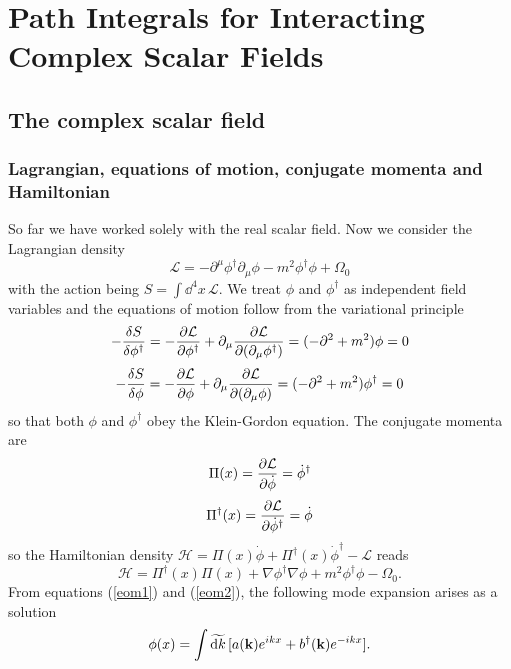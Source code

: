 \chapter{Path Integrals for Interacting Complex Scalar Fields}
\section{The complex scalar field}
\subsection{Lagrangian, equations of motion, conjugate momenta and Hamiltonian}
So far we have worked solely with the real scalar field. Now we consider the Lagrangian density
\begin{equation}
\mathcal{L}=-\partial^{\mu} \phi^{\dagger} \partial_{\mu} \phi-{m}^{2} \phi^{\dagger} \phi+\Omega_{0}
\end{equation}
with the action being $S=\int\dd^4 x\, \mathcal{L}$. We treat $\phi$ and $\phi^\dagger$ as independent field variables and the equations of motion follow from the variational principle
\begin{equation}
    -\fdv{S}{\phi^\dagger}=-\pdv{\mathcal{L}}{\phi^\dagger}+\partial_\mu\pdv{\mathcal{L}}{(\partial_\mu\phi^\dagger)}=(-\partial^2+m^2)\phi=0
    \label{eom1}
\end{equation}
\begin{equation}
    -\fdv{S}{\phi}=-\pdv{\mathcal{L}}{\phi}+\partial_\mu\pdv{\mathcal{L}}{(\partial_\mu\phi)}=(-\partial^2+m^2)\phi^\dagger=0
    \label{eom2}
\end{equation}
so that both $\phi$ and $\phi^\dagger$ obey the Klein-Gordon equation. The conjugate momenta are
\begin{equation}
    \Pi(x)=\pdv{\mathcal{L}}{\dot{\phi}}=\dot{\phi}^\dagger
\end{equation}
\begin{equation}
    \Pi^\dagger(x)=\pdv{\mathcal{L}}{\dot{\phi}^\dagger}=\dot{\phi}
\end{equation}
so the Hamiltonian density $\mathcal{H}=\Pi(x) \dot{\phi}+\Pi^{\dagger}(x) \dot{\phi}^{\dagger}-\mathcal{L}$ reads
\begin{equation}
\mathcal{H}=\Pi^{\dagger}(x) \Pi(x)+\nabla \phi^{\dagger} \nabla \phi+m^{2} \phi^{\dagger} \phi-\Omega_{0}.
\end{equation}
From equations (\ref{eom1}) and (\ref{eom2}), the following mode expansion arises as a solution
\begin{equation}
     \phi(x)=\int\widetilde{\dd k}\, [a(\vb{k})e^{ikx}+b^\dagger(\vb{k})e^{-ikx}].
\end{equation}
